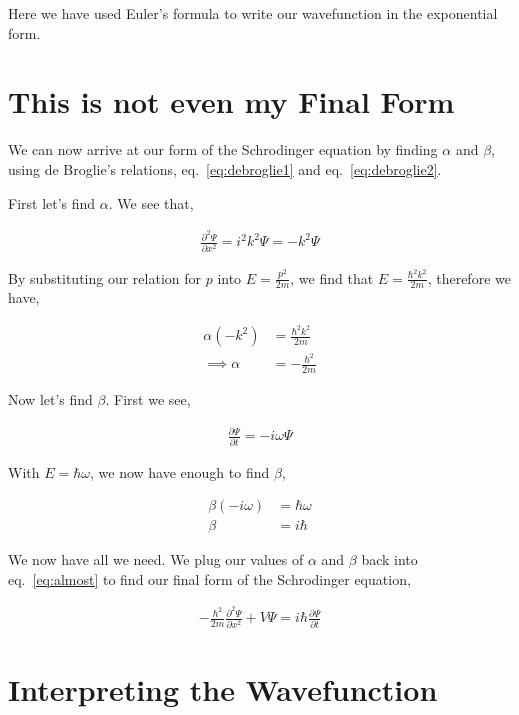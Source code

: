\documentclass[11pt]{amsart}
\begin{document}
Here we have used Euler's formula to write our wavefunction in the exponential form.

\section{This is not even my Final Form}

We can now arrive at our form of the Schrodinger equation by finding $\alpha$ and $\beta$, using de Broglie's relations, eq.~\ref{eq:debroglie1} and eq.~\ref{eq:debroglie2}.

First let's find $\alpha$. We see that,

\begin{align*}
\frac{\partial^2 \Psi}{\partial x^2} = i^2 k^2 \Psi = -k^2 \Psi
\end{align*}

By substituting our relation for $p$ into $E = \frac{p^2}{2m}$, we find that $E= \frac{\hbar^2 k^2}{2m}$, therefore we have,

\begin{align*}
\alpha(-k^2) &= \frac{\hbar^2 k^2}{2m} \\
\implies \alpha &= -\frac{\hbar^2}{2m}
\end{align*}

Now let's find $\beta$. First we see,

\begin{align*}
\frac{\partial \Psi}{\partial t} = -i \omega \Psi
\end{align*}

With $E = \hbar \omega$, we now have enough to find $\beta$,

\begin{align*}
\beta(-i \omega) &= \hbar \omega \\
\beta &= i\hbar
\end{align*}

We now have all we need. We plug our values of $\alpha$ and $\beta$ back into eq.~\ref{eq:almost} to find our final form of the Schrodinger equation,

\begin{align*}
-\frac{\hbar^2}{2m} \frac{\partial^2 \Psi}{\partial x^2} + V\Psi = i\hbar\frac{\partial \Psi}{\partial t}
\end{align*}

\section{Interpreting the Wavefunction}
\end{document}

